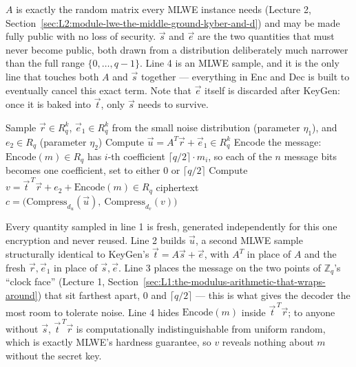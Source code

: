 $A$ is exactly the random matrix every MLWE instance needs (Lecture 2, Section~\ref{sec:L2:module-lwe-the-middle-ground-kyber-and-d}) and may be made fully public with no loss of security. $\vec s$ and $\vec e$ are the two quantities that must never become public, both drawn from a distribution deliberately much narrower than the full range $\{0,\ldots,q-1\}$. Line 4 is an MLWE sample, and it is the only line that touches both $A$ and $\vec s$ together --- everything in Enc and Dec is built to eventually cancel this exact term. Note that $\vec e$ itself is discarded after KeyGen: once it is baked into $\vec t$, only $\vec s$ needs to survive.

\begin{algorithm}[ht]
\caption{Kyber.CPAPKE.Enc$(pk = (A,\vec t),\ m \in \{0,1\}^n)$}
\begin{algorithmic}[1]
\State Sample $\vec r \in R_q^k$, $\vec e_1 \in R_q^k$ from the small noise distribution (parameter $\eta_1$), and $e_2 \in R_q$ (parameter $\eta_2$)
\State Compute $\vec u = A^T \vec r + \vec e_1 \in R_q^k$
\State Encode the message: $\mathrm{Encode}(m) \in R_q$ has $i$-th coefficient $\lceil q/2\rceil \cdot m_i$, so each of the $n$ message bits becomes one coefficient, set to either $0$ or $\lceil q/2\rceil$
\State Compute $v = \vec t^{\,T}\vec r + e_2 + \mathrm{Encode}(m) \in R_q$
\State \Return ciphertext $c = \big(\mathrm{Compress}_{d_u}(\vec u),\ \mathrm{Compress}_{d_v}(v)\big)$
\end{algorithmic}
\end{algorithm}

Every quantity sampled in line 1 is fresh, generated independently for this one encryption and never reused. Line 2 builds $\vec u$, a second MLWE sample structurally identical to KeyGen's $\vec t=A\vec s+\vec e$, with $A^T$ in place of $A$ and the fresh $\vec r,\vec e_1$ in place of $\vec s,\vec e$. Line 3 places the message on the two points of $\mathbb{Z}_q$'s ``clock face'' (Lecture 1, Section~\ref{sec:L1:the-modulus-arithmetic-that-wraps-around}) that sit farthest apart, $0$ and $\lceil q/2\rceil$ --- this is what gives the decoder the most room to tolerate noise. Line 4 hides $\mathrm{Encode}(m)$ inside $\vec t^{\,T}\vec r$; to anyone without $\vec s$, $\vec t^{\,T}\vec r$ is computationally indistinguishable from uniform random, which is exactly MLWE's hardness guarantee, so $v$ reveals nothing about $m$ without the secret key.

